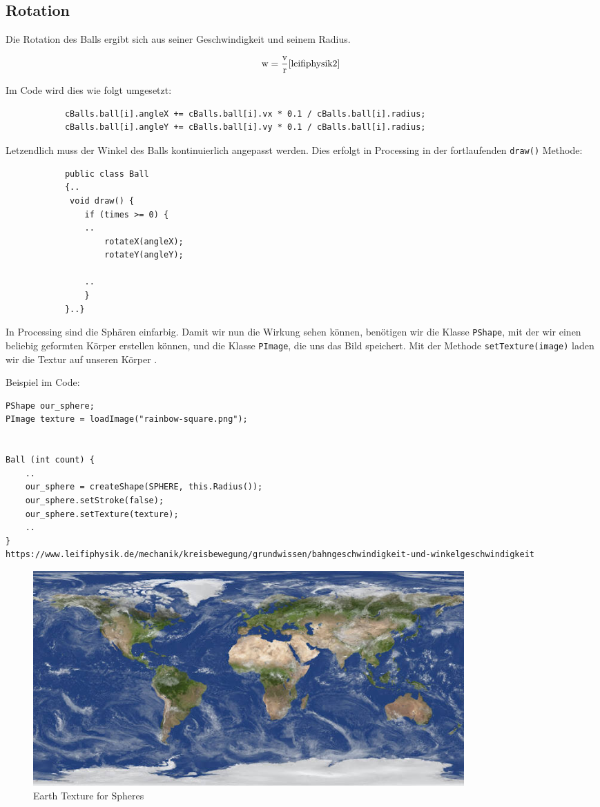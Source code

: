 \documentclass[12pt,a4paper]{article}
\begin{document}
		
		\subsection{Rotation}
		
		 Die Rotation des Balls ergibt sich aus seiner Geschwindigkeit und seinem Radius.
		
\[
\text{w} = \frac{\text{v}}{\text{r}} \cite{leifiphysik2}~
\]

		
		Im Code wird dies wie folgt umgesetzt:
		
		\begin{verbatim}
			cBalls.ball[i].angleX += cBalls.ball[i].vx * 0.1 / cBalls.ball[i].radius;
			cBalls.ball[i].angleY += cBalls.ball[i].vy * 0.1 / cBalls.ball[i].radius;
		\end{verbatim}
		
		
		Letzendlich muss der Winkel des Balls kontinuierlich angepasst werden. Dies erfolgt in Processing in der fortlaufenden \texttt{draw()} Methode:
		
		\begin{verbatim}
			public class Ball
			{..
			 void draw() {
				if (times >= 0) {
				..
					rotateX(angleX);     
					rotateY(angleY);      
					
				..
				}
			}..}
		\end{verbatim}
		
		In Processing sind die Sphären einfarbig. Damit wir nun die Wirkung sehen können, benötigen wir die Klasse \texttt{PShape}, mit der wir einen beliebig geformten Körper erstellen können, und die Klasse \texttt{PImage}, die uns das Bild speichert. Mit der Methode \texttt{setTexture(image)} laden wir die Textur auf unseren Körper \cite{processing}.
		
		
		
			\vspace{0.5cm}
		Beispiel im Code:
		
		\begin{verbatim}
PShape our_sphere;
PImage texture = loadImage("rainbow-square.png");


Ball (int count) {
	..
	our_sphere = createShape(SPHERE, this.Radius());
	our_sphere.setStroke(false);
	our_sphere.setTexture(texture);
	..
}
https://www.leifiphysik.de/mechanik/kreisbewegung/grundwissen/bahngeschwindigkeit-und-winkelgeschwindigkeit
		\end{verbatim}
		
		\begin{figure}[H]
			\centering 
			\includegraphics[width=0.8\textwidth]{../data/earth.png}  
			\caption{Earth Texture for Spheres} 
			\label{Bild: Earth}  
		\end{figure}
		
\end{document}
